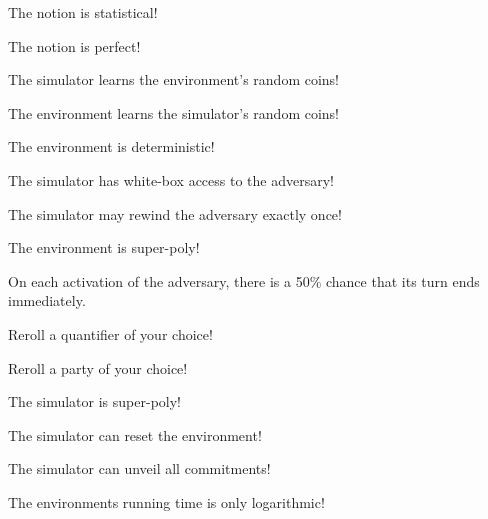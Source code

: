 \documentclass[avery5371,frame,grid]{flashcards}
\begin{document}
\begin{flashcard}{\ucftw}
  The notion is statistical!
  \stopcard
\end{flashcard}
\begin{flashcard}{\ucftw}
  The notion is perfect!
  \stopcard
\end{flashcard}
\begin{flashcard}{\ucftw}
  The simulator learns the environment's random coins!
  \stopcard
\end{flashcard}
\begin{flashcard}{\ucftw}
  The environment learns the simulator's random coins!
  \stopcard
\end{flashcard}
\begin{flashcard}{\ucftw}
  The environment is deterministic!
  \stopcard
\end{flashcard}
\begin{flashcard}{\ucftw}
  The simulator has white-box access to the adversary!
  \stopcard
\end{flashcard}
\begin{flashcard}{\ucftw}
  The simulator may rewind the adversary exactly once!
  \stopcard
\end{flashcard}
\begin{flashcard}{\ucftw}
  The environment is super-poly!
  \stopcard
\end{flashcard}
\begin{flashcard}{\ucftw}
  On each activation of the adversary, there is a 50\% chance that its turn ends immediately. 
  \stopcard
\end{flashcard}
\begin{flashcard}{\ucftw}
  Reroll a quantifier of your choice!
  \stopcard
\end{flashcard}
\begin{flashcard}{\ucftw}
  Reroll a party of your choice!
  \stopcard
\end{flashcard}
\begin{flashcard}{\ucftw}
  The simulator is super-poly!
  \stopcard
\end{flashcard}
\begin{flashcard}{\ucftw}
  The simulator can reset the environment!
  \stopcard
\end{flashcard}
\begin{flashcard}{\ucftw}
  The simulator can unveil all commitments!
  \stopcard
\end{flashcard}
\begin{flashcard}{\ucftw}
  The environments running time is only logarithmic!
  \stopcard
\end{flashcard}
\end{document}
